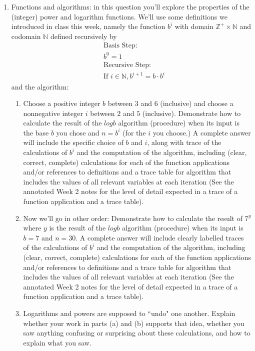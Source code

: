 \begin{enumerate}[labelindent=0pt, leftmargin=0pt]
\item Functions and algorithms: in this question you'll explore the properties of the (integer) power and logarithm
functions. We'll use some definitions we introduced in class this week, namely the function
$b^i$ with domain $\mathbb{Z}^+ \times \mathbb{N}$ and codomain $\mathbb{N}$ defined recursively by
\begin{align*}    
&\textrm{Basis Step:} \\
&b^0 = 1 \\
&\textrm{Recursive Step:}\\
&\textrm{If } i \in \mathbb{N}, b^{i+1} = b \cdot b^i
\end{align*}
and the algorithm:



    \begin{enumerate}
    \item\gradeCorrectFirst Choose a positive integer $b$ between $3$ and $6$ (inclusive) and choose a 
    nonnegative integer $i$ between $2$ and $5$ (inclusive). Demonstrate how to calculate 
    the result of the $logb$ algorithm (procedure) when its input is the base $b$ you chose and
    $n = b^i$ (for the $i$ you choose.) 
    A complete answer will include the specific choice of $b$ and $i$, along with 
    trace of the calculations of $b^i$ and the computation of the algorithm, including 
    (clear, correct, complete) calculations for each of the function applications 
    and/or references to definitions and a trace table for algorithm that includes the values of all relevant 
    variables at each iteration (See the annotated Week 2 notes for the level of detail expected
    in a trace of a function application and a trace table).
    \item\gradeCorrect Now we'll go in other order: Demonstrate how to calculate the result of 
    $7^y$ where $y$ is the result of the $logb$ algorithm (procedure) when its input is $b=7$ and $n=30$.
    A complete answer will include clearly labelled 
    traces of the calculations of $b^i$ and the computation of the algorithm, including 
    (clear, correct, complete) calculations for each of the function applications 
    and/or references to definitions and a trace table for algorithm that includes the values of all relevant 
    variables at each iteration (See the annotated Week 2 notes for the level of detail expected
    in a trace of a function application and a trace table).    
    \item\gradeCompleteFirst Logarithms and powers are supposed to ``undo" one another. Explain whether your work in parts (a) and (b)
    supports that idea,  whether you saw anything confusing or surprising about these calculations, and how to explain what you saw.
    \end{enumerate}


\end{enumerate}
